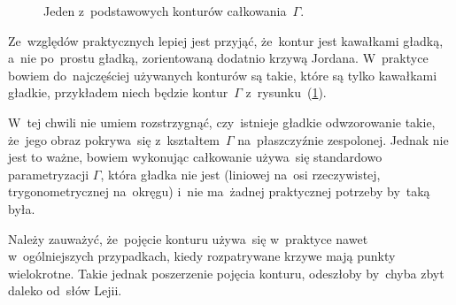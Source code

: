 \documentclass[a4paper,11pt]{article}
\begin{document}
\begin{figure}
  \centering


  \caption{Jeden z~podstawowych konturów całkowania~$\Gamma$.}

  \label{fig:Leja-01}
\end{figure}



\start {} Ze~względów praktycznych lepiej jest przyjąć,
że~kontur jest kawałkami gładką, a~nie po~prostu gładką, zorientowaną
dodatnio krzywą Jordana. W~praktyce bowiem do~najczęściej używanych
konturów są takie, które są tylko kawałkami gładkie, przykładem niech
będzie kontur~$\Gamma$ z~rysunku~(\ref{fig:Leja-01}).

W~tej chwili nie umiem rozstrzygnąć, czy~istnieje gładkie odwzorowanie
takie, że~jego obraz pokrywa~się z~kształtem~$\Gamma$ na~płaszczyźnie
zespolonej. Jednak nie jest to ważne, bowiem wykonując całkowanie
używa~się standardowo parametryzacji $\Gamma$, która gładka nie jest
(liniowej na~osi rzeczywistej, trygonometrycznej na~okręgu) i~nie
ma~żadnej praktycznej potrzeby by~taką była.

Należy zauważyć, że~pojęcie konturu używa~się w~praktyce nawet
w~ogólniejszych przypadkach, kiedy rozpatrywane krzywe mają punkty
wielokrotne. Takie jednak poszerzenie pojęcia konturu, odeszłoby
by~chyba zbyt daleko od~słów Lejii.
\end{document}
